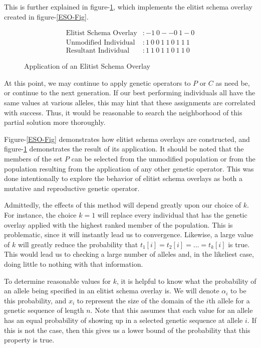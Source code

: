 This is further explained in figure-\ref{ESO-apl}, which implements the elitist schema overlay created in figure-\ref{ESO-Fig}.

\begin{figure}[h!]
\centering 
\begin{align*}
\text{Elitist Schema Overlay} &:   -1~0--0~1-0			\\  
\text{Unmodified Individual} &: 1~0~0~1~1~0~1~1~1	\\		
\text{Resultant Individual} &: 1~1~0~1~1~0~1~1~0
\end{align*}
\caption{Application of an Elitist Schema Overlay}
\label{ESO-apl}
\end{figure}

At this point, we may continue to apply genetic operators to $P$ or $C$ as need be, or continue to the next generation. If our best performing individuals all have the same values at various alleles, this may hint that these assignments are correlated with success. Thus, it would be reasonable to search the neighborhood of this partial solution more thoroughly. 

Figure-\ref{ESO-Fig} demonstrates how elitist schema overlays are constructed, and figure-\ref{ESO-apl} demonstrates the result of its application. It should be noted that the members of the set $P$ can be selected from the unmodified population or from the population resulting from the application of any other genetic operator. This was done intentionally to explore the behavior of elitist schema overlays as both a mutative and reproductive genetic operator. 

Admittedly, the effects of this method will depend greatly upon our choice of $k$. For instance, the choice $k = 1$ will replace every individual that has the genetic overlay applied with the highest ranked member of the population. This is problematic, since it will instantly lead us to convergence. Likewise, a large value of $k$ will greatly reduce the probability that $t_1[i] = t_2[i] = \ldots = t_k[i]$ is true. This would lead us to checking a large number of alleles and, in the likeliest case, doing little to nothing with that information.

To determine reasonable values for $k$, it is helpful to know what the probability of an allele being specified in an elitist schema overlay is. We will denote $\alpha_i$ to be this probability, and $x_i$ to represent the size of the domain of the $i$th allele for a genetic sequence of length $n$. Note that this assumes that each value for an allele has an equal probability of showing up in a selected genetic sequence at allele $i$. If this is not the case, then this gives us a lower bound of the probability that this property is true.

